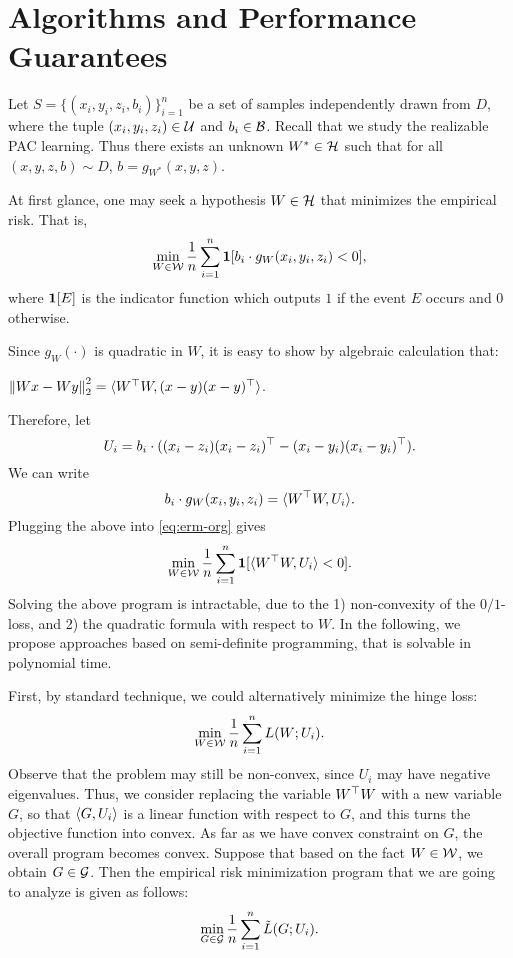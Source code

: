 \section{Algorithms and Performance Guarantees}\label{sec:alg}


Let $S = \{ (x_i, y_i, z_i, b_i) \}_{i=1}^n$ be a set of samples independently drawn from $D$, where the tuple $(x_i, y_i, z_i) \in \mathcal{U}$ and $b_i \in \mathcal{B}$. Recall that we study the realizable PAC learning. Thus there exists an unknown $W^* \in \mathcal{H}$ such that for all $(x, y, z, b) \sim D$, $b = g_{W^*}(x, y, z)$.

At first glance, one may seek a hypothesis $W \in \mathcal{H}$ that minimizes the empirical risk. That is,
\begin{equation}\label{eq:erm-org}
\min_{W \in \mathcal{W}}  \frac{1}{n} \sum_{i=1}^{n} \mathbf{1}[b_i \cdot g_W(x_i, y_i, z_i) < 0],
\end{equation}
where $\mathbf{1}[E]$ is the indicator function which outputs $1$ if the event $E$ occurs and $0$ otherwise.

Since $g_W(\cdot)$ is quadratic in $W$, it is easy to show by algebraic calculation that:
\begin{lemma}\label{lem:Wx-Wy}
$\left\lVert Wx - Wy \right\rVert_{2}^2 = \langle W^{\top} W, (x-y)(x-y)^{\top} \rangle$.
\end{lemma}

Therefore, let 
\begin{equation}\label{eq:U_i}
U_i = b_i \cdot ( (x_i-z_i)(x_i-z_i)^{\top} - (x_i-y_i)(x_i-y_i)^{\top} ).
\end{equation}
We can write
\begin{equation*}
b_i \cdot g_W(x_i, y_i, z_i) = \langle W^{\top} W, U_i \rangle.
\end{equation*}
Plugging the above into \eqref{eq:erm-org} gives
\begin{equation}
\min_{W \in \mathcal{W}} \frac{1}{n} \sum_{i=1}^n \mathbf{1}[ \langle W^{\top} W, U_i \rangle < 0 ].
\end{equation}
Solving the above program is intractable, due to the 1) non-convexity of the $0/1$-loss, and 2) the quadratic formula with respect to $W$. In the following, we propose approaches based on semi-definite programming, that is solvable in polynomial time.

First, by standard technique, we could alternatively minimize the hinge loss:
\begin{equation}\label{eq:ERM}
\min_{W \in \mathcal{W}} \frac{1}{n} \sum_{i=1}^n L(W; U_i).
\end{equation}
Observe that the problem may still be non-convex, since $U_i$ may have negative eigenvalues. Thus, we consider replacing the variable $W^{\top} W$ with a new variable $G$, so that $\langle G, U_i \rangle$ is a linear function with respect to $G$, and this turns the objective function into convex. As far as we have convex constraint on $G$, the overall program becomes convex. Suppose that based on the fact $W \in \mathcal{W}$, we obtain $G \in \mathcal{G}$. Then the empirical risk minimization program that we are going to analyze is given as follows:
\begin{equation}\label{eq:ERM-convex}
\min_{G \in \mathcal{G}} \frac{1}{n} \sum_{i=1}^n \tilde{L}(G; U_i).
\end{equation}


